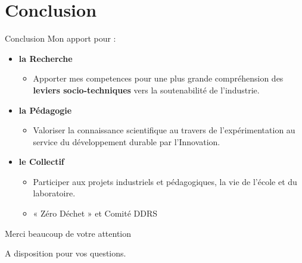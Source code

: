\documentclass[
  11pt,
  ignorenonframetext,
  aspectratio=169,
  c]{beamer}
\providecommand{\tightlist}{%
  \setlength{\itemsep}{0pt}\setlength{\parskip}{0pt}}\usepackage{longtable,booktabs,array}
\begin{document}
\hypertarget{conclusion}{%
\section{Conclusion}\label{conclusion}}

\begin{frame}{Conclusion}
Mon apport pour :

\begin{itemize}
\item
  \textbf{la Recherche}

  \begin{itemize}
  \tightlist
  \item
    Apporter mes competences pour une plus grande compréhension des
    \textbf{leviers socio-techniques} vers la soutenabilité de
    l'industrie.
  \end{itemize}
\item
  \textbf{la Pédagogie}

  \begin{itemize}
  \tightlist
  \item
    Valoriser la connaissance scientifique au travers de
    l'expérimentation au service du développement durable par
    l'Innovation.
  \end{itemize}
\item
  \textbf{le Collectif}

  \begin{itemize}
  \tightlist
  \item
    Participer aux projets industriels et pédagogiques, la vie de
    l'école et du laboratoire.
  \item
    « Zéro Déchet » et Comité DDRS
  \end{itemize}
\end{itemize}
\end{frame}

\begin{frame}{Merci beaucoup de votre attention}
\protect\hypertarget{merci-beaucoup-de-votre-attention}{}
\begin{block}{A disposition pour vos questions.}
\protect\hypertarget{a-disposition-pour-vos-questions.}{}
\end{block}
\end{frame}
\end{document}
